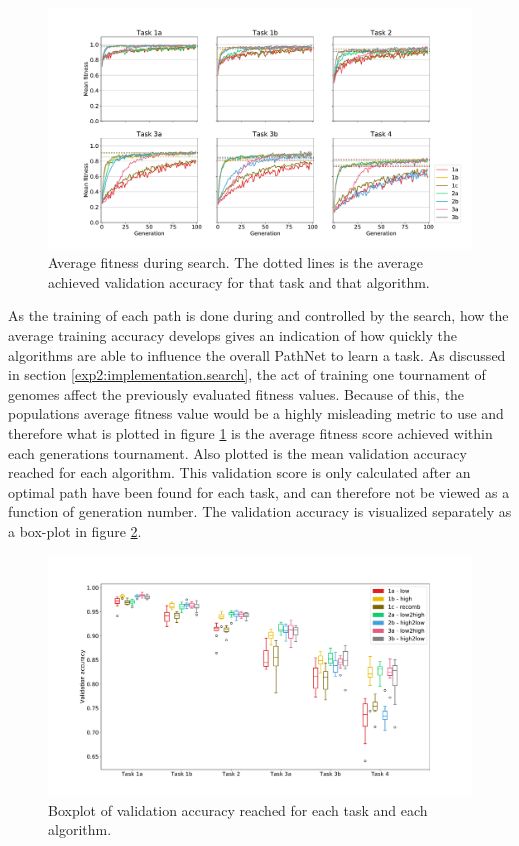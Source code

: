 \begin{figure}
    \includegraphics[width=1.2\textwidth,center]{Chapters/4.Experiments/exp2/figures/inuse/Training_accuracy.pdf}
    \caption[Fitness plot]{Average fitness during search. The dotted lines is the average achieved validation accuracy for that task and that algorithm.}
    \label{fig:search.accuracy}
\end{figure}

As the training of each path is done during and controlled by the search, how the average training accuracy develops gives an indication of how quickly the algorithms are able to influence the overall PathNet to learn a task. As discussed in section \ref{exp2:implementation.search}, the act of training one tournament of genomes affect the previously evaluated fitness values. Because of this, the populations average fitness value would be a highly misleading metric to use and therefore what is plotted in figure \ref{fig:search.accuracy} is the average fitness score achieved within each generations tournament. Also plotted is the mean validation accuracy reached for each algorithm. This validation score is only calculated after an optimal path have been found for each task, and can therefore not be viewed as a function of generation number. The validation accuracy is visualized separately as a box-plot in figure \ref{fig:search.validation}.

\begin{figure}
    \includegraphics[width=1.2\textwidth, center]{Chapters/4.Experiments/exp2/figures/inuse/validation_boxplot.pdf}
    \caption[Validation accuracy plot]{Boxplot of validation accuracy reached for each task and each algorithm.}
    \label{fig:search.validation}
\end{figure}

